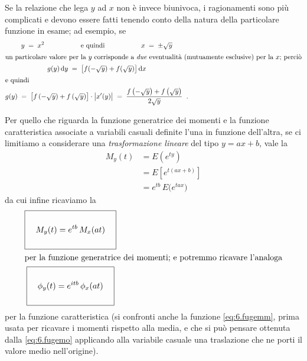 Se la relazione che lega $y$ ad $x$ non \`e invece
biunivoca, i ragionamenti sono pi\`u complicati e devono
essere fatti tenendo conto della natura della particolare
funzione in esame; ad esempio, se
\begin{gather*}
  y \; = \; x^2 \makebox[50mm]{e quindi} x \; = \; \pm
    \sqrt{y}\\
  \intertext{un particolare valore per la $y$
    corrisponde a \emph{due} eventualit\`a (mutuamente
    esclusive) per la $x$; perci\`o}
  g(y) \, \de y \; = \; \bigl[ f ( -\sqrt{y} ) + f( \sqrt{y}
    ) \bigr] \, \de x \\
  \intertext{e quindi}
  g(y) \; = \; \bigl[ f \left( - \sqrt{y} \right) + f
    \left( \sqrt{y} \right) \bigr] \cdot \bigl| x'(y)
    \bigr| \; = \; \frac{ f \left( - \sqrt{y} \right)
    + f \left( \sqrt{y} \right) }{2 \sqrt{y}} \peq .
\end{gather*}%

%
%
Per quello che riguarda la funzione generatrice dei momenti
e la funzione caratteristica associate a variabili casuali
definite l'una in funzione dell'altra, se ci limitiamo a
considerare una \emph{trasformazione lineare} del tipo
$y=ax+b$, vale la
\begin{align*}
  M_y(t) &= E \left( e^{ty} \right) \\[1ex]
  &= E \left[ e^{t \left( ax+b \right)} \right] \\[1ex]
  &= e^{tb} \, E \bigl( e^{tax} \bigr)
\end{align*}
da cui infine ricaviamo la
\begin{gather}
  \boxed{ \rule[-6mm]{0mm}{14mm} \quad
    M_y(t) = e^{tb} \, M_x(at) \quad }
    \label{eq:6.fgmcav} \\
  \intertext{per la funzione generatrice dei momenti; e
    potremmo ricavare l'analoga}
  \boxed{ \rule[-6mm]{0mm}{14mm} \quad
    \phi_y(t) = e^{itb} \, \phi_x(at) \quad }
    \label{eq:6.fuccav}
\end{gather}
per la funzione caratteristica (si confronti anche la
funzione \eqref{eq:6.fugemm}, prima usata per ricavare i
momenti rispetto alla media, e che si pu\`o pensare ottenuta
dalla \eqref{eq:6.fugemo} applicando alla variabile casuale
una traslazione che ne porti il valore medio nell'origine).%
%

